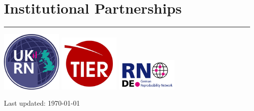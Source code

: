 \documentclass[letterpaper]{article}
\begin{document}
\section*{\color{Brown}Institutional Partnerships}


\vspace{-.5em}
\hrule
\vspace{1em}
    \large \color{Gray}



\centering
\includegraphics[width=3cm]{UKRN.png}
\includegraphics[width=3cm]{ProjectTier.png}
\includegraphics[width=3cm]{RN_German.png}





\bigskip

\begin{center}
  \begin{footnotesize}
    Last updated: \today \\
  \end{footnotesize}
\end{center}
\end{document}
